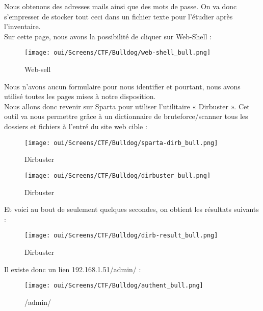 Nous obtenons des adresses mails ainsi que des mots de passe. On va donc s’empresser de stocker tout ceci dans un fichier texte pour l’étudier après l’inventaire.\\
Sur cette page, nous avons la possibilité de cliquer sur Web-Shell :

\begin{figure}[htp!]
  \centering
  \setlength\figureheight{7cm}
  \setlength\figurewidth{9cm}
  \texttt{[image: oui/Screens/CTF/Bulldog/web-shell\_bull.png]}
  \caption{Web-sell}
  \label{fig:courbe-tikz}
\end{figure}

\newpage
Nous n’avons aucun formulaire pour nous identifier et pourtant, nous avons utilisé toutes les pages mises à notre disposition. \\
Nous allons donc revenir sur Sparta pour utiliser l’utilitaire « Dirbuster ». Cet outil va nous permettre grâce à un dictionnaire de bruteforce/scanner tous les dossiers et fichiers à l’entré du site web cible :

\begin{figure}[htp!]
  \centering
  \setlength\figureheight{7cm}
  \setlength\figurewidth{9cm}
  \texttt{[image: oui/Screens/CTF/Bulldog/sparta-dirb\_bull.png]}
  \caption{Dirbuster}
  \label{fig:courbe-tikz}
\end{figure}

\begin{figure}[htp!]
  \centering
  \setlength\figureheight{7cm}
  \setlength\figurewidth{9cm}
  \texttt{[image: oui/Screens/CTF/Bulldog/dirbuster\_bull.png]}
  \caption{Dirbuster}
  \label{fig:courbe-tikz}
\end{figure}

\newpage
Et voici au bout de seulement quelques secondes, on obtient les résultats suivants :

\begin{figure}[htp!]
  \centering
  \setlength\figureheight{7cm}
  \setlength\figurewidth{9cm}
  \texttt{[image: oui/Screens/CTF/Bulldog/dirb-result\_bull.png]}
  \caption{Dirbuster}
  \label{fig:courbe-tikz}
\end{figure}

Il existe donc un lien 192.168.1.51/admin/ :

\begin{figure}[htp!]
  \centering
  \setlength\figureheight{7cm}
  \setlength\figurewidth{9cm}
  \texttt{[image: oui/Screens/CTF/Bulldog/authent\_bull.png]}
  \caption{/admin/}
  \label{fig:courbe-tikz}
\end{figure}

